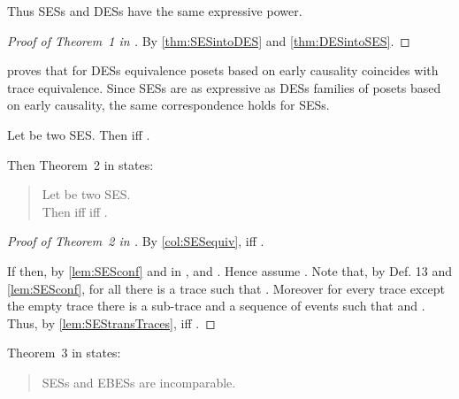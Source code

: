 \documentclass[runningheads,a4paper]{llncs}
\begin{document}
Thus SESs and DESs have the same expressive power.

\begin{proof}[Proof of Theorem~1 in \cite{dynamicCausality15}]
	By \ths\ref{thm:SESintoDES} and \ref{thm:DESintoSES}.
\end{proof}

\cite{Langerak97causalambiguity} proves that for DESs equivalence \wrt posets
based on early causality coincides with trace equivalence. Since SESs are as expressive as DESs \wrt families of posets based on early causality, the same correspondence holds for SESs.

\begin{corollary}
	\label{col:SESequiv}
	Let  be two SES. Then  iff .
\end{corollary}

Then Theorem~2 in \cite{dynamicCausality15} states:
\begin{quote}
	Let  be two SES.\\
	Then  iff  iff .
\end{quote}

\begin{proof}[Proof of Theorem~2 in \cite{dynamicCausality15}]
	By \cor\ref{col:SESequiv},  iff .
	
	If  then, by \lem\ref{lem:SESconf} and  in \cite{dynamicCausality15},  and . Hence assume .
	Note that, by Def. 13 and \lem\ref{lem:SESconf}, for all  there is a trace  such that . Moreover for every trace  except the empty trace there is a sub-trace  and a sequence of events  such that  and .
	Thus, by \lem\ref{lem:SEStransTraces},  iff .
\end{proof}

Theorem~3 in \cite{dynamicCausality15} states:
\begin{quote}
	SESs and EBESs are incomparable.
\end{quote}
\end{document}
